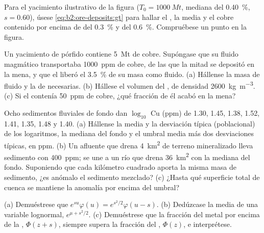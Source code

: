 \begin{exercise}[$\star\star$]\label{exo:b2:ore-deposits:7}
Para el yacimiento ilustrativo de la figura ($T_0 = \qty{1000}{Mt}$, mediana del \qty{0.40}{\percent},
$s = 0.60$), úsese \eqref{eq:b2:ore-deposits:gt} para hallar el , la  media y el cobre contenido
por encima de  del \qty{0.3}{\percent} y del \qty{0.6}{\percent}. Compruébese un punto en la figura.
\end{exercise}

\begin{exercise}[$\star\star$]\label{exo:b2:ore-deposits:8}
Un yacimiento de pórfido contiene \qty{5}{Mt} de cobre. Supóngase que su fluido magmático transportaba \qty{1000}{ppm}
de cobre, de las que la mitad se depositó en la mena, y que el  liberó el \qty{3.5}{\percent}
de su masa como fluido. (a) Hállense la masa de fluido y la de  necesarias. (b) Hállese el volumen del
, de densidad \qty{2600}{kg.m^{-3}}. (c) Si el  contenía \qty{50}{ppm} de cobre, ¿qué fracción
de él acabó en la mena?
\end{exercise}

\begin{exercise}[$\star\star$]\label{exo:b2:ore-deposits:9}
Ocho sedimentos fluviales de fondo dan $\log_{10}$ Cu (ppm) de 1.30, 1.45, 1.38, 1.52, 1.41, 1.35,
1.48 y 1.40. (a) Hállense la media y la desviación típica (poblacional) de los logaritmos, la
mediana del fondo y el umbral media más dos desviaciones típicas, en ppm. (b) Un afluente
que drena \qty{4}{km^2} de terreno mineralizado lleva sedimento con \qty{400}{ppm}; se une a un río
que drena \qty{36}{km^2} con la mediana del fondo. Suponiendo que cada kilómetro cuadrado aporta la misma
masa de sedimento, ¿es anómalo el sedimento mezclado? (c) ¿Hasta qué superficie total de cuenca se mantiene la
anomalía por encima del umbral?
\end{exercise}

\begin{exercise}[$\star\star\star$]\label{exo:b2:ore-deposits:10}
(a) Demuéstrese que $e^{su}\varphi(u) = e^{s^2/2}\varphi(u - s)$. (b) Dedúzcase la media de una variable
lognormal, $e^{\mu + s^2/2}$. (c) Demuéstrese que la fracción del metal por encima de la ,
$\Phi(z + s)$, siempre supera la fracción del , $\Phi(z)$, e interprétese.
\end{exercise}


